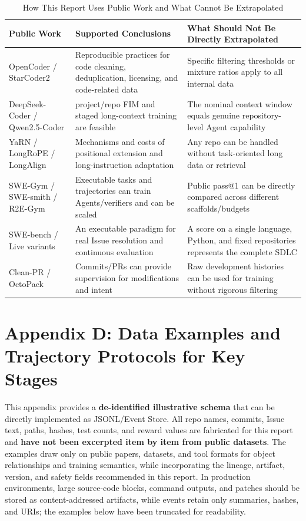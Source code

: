 \documentclass[10pt,a4paper,UTF8,fontset=none]{ctexart}
\begin{document}
\begin{table}[htbp]
\centering
\caption{How This Report Uses Public Work and What Cannot Be Extrapolated}
\label{tab:evidence-boundary}
\small
\begin{tabularx}{\textwidth}{p{3.0cm}YY}
\toprule
Public Work & Supported Conclusions & What Should Not Be Directly Extrapolated \\
\midrule
OpenCoder / StarCoder2 & Reproducible practices for code cleaning, deduplication, licensing, and code-related data & Specific filtering thresholds or mixture ratios apply to all internal data \\
DeepSeek-Coder / Qwen2.5-Coder & project/repo FIM and staged long-context training are feasible & The nominal context window equals genuine repository-level Agent capability \\
YaRN / LongRoPE / LongAlign & Mechanisms and costs of positional extension and long-instruction adaptation & Any repo can be handled without task-oriented long data or retrieval \\
SWE-Gym / SWE-smith / R2E-Gym & Executable tasks and trajectories can train Agents/verifiers and can be scaled & Public pass@1 can be directly compared across different scaffolds/budgets \\
SWE-bench / Live variants & An executable paradigm for real Issue resolution and continuous evaluation & A score on a single language, Python, and fixed repositories represents the complete SDLC \\
Clean-PR / OctoPack & Commits/PRs can provide supervision for modifications and intent & Raw development histories can be used for training without rigorous filtering \\
\bottomrule
\end{tabularx}
\end{table}

\section{Appendix D: Data Examples and Trajectory Protocols for Key Stages}

This appendix provides a \textbf{de-identified illustrative schema} that can be directly implemented as JSONL/Event Store. All repo names, commits, Issue text, paths, hashes, test counts, and reward values are fabricated for this report and \textbf{have not been excerpted item by item from public datasets}. The examples draw only on public papers, datasets, and tool formats for object relationships and training semantics, while incorporating the lineage, artifact, version, and safety fields recommended in this report. In production environments, large source-code blocks, command outputs, and patches should be stored as content-addressed artifacts, while events retain only summaries, hashes, and URIs; the examples below have been truncated for readability.
\end{document}
